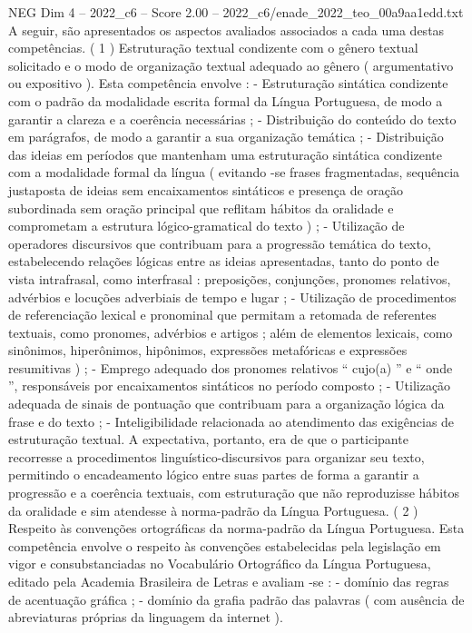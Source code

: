 \begin{textsample}{NEG Dim 4 – 2022\_c6 – Score 2.00 – 2022\_c6/enade\_2022\_teo\_00a9aa1edd.txt}
A seguir, são apresentados os aspectos avaliados associados a cada uma destas competências. ( 1 ) Estruturação textual condizente com o gênero textual solicitado e o modo de organização textual adequado ao gênero ( argumentativo ou expositivo ).
Esta competência envolve : - Estruturação sintática condizente com o padrão da modalidade escrita formal da Língua Portuguesa, de modo a garantir a clareza e a coerência necessárias ; - Distribuição do conteúdo do texto em parágrafos, de modo a garantir a sua organização temática ; - Distribuição das ideias em períodos que mantenham uma estruturação sintática condizente com a modalidade formal da língua ( evitando -se frases fragmentadas, sequência justaposta de ideias sem encaixamentos sintáticos e presença de oração subordinada sem oração principal que reflitam hábitos da oralidade e comprometam a estrutura lógico-gramatical do texto ) ; - Utilização de operadores discursivos que contribuam para a progressão temática do texto, estabelecendo relações lógicas entre as ideias apresentadas, tanto do ponto de vista intrafrasal, como interfrasal : preposições, conjunções, pronomes relativos, advérbios e locuções adverbiais de tempo e lugar ; - Utilização de procedimentos de referenciação lexical e pronominal que permitam a retomada de referentes textuais, como pronomes, advérbios e artigos ; além de elementos lexicais, como sinônimos, hiperônimos, hipônimos, expressões metafóricas e expressões resumitivas ) ; - Emprego adequado dos pronomes relativos “ cujo(a) ” e “ onde ”, responsáveis por encaixamentos sintáticos no período composto ; - Utilização adequada de sinais de pontuação que contribuam para a organização lógica da frase e do texto ; - Inteligibilidade relacionada ao atendimento das exigências de estruturação textual.
A expectativa, portanto, era de que o participante recorresse a procedimentos linguístico-discursivos para organizar seu texto, permitindo o encadeamento lógico entre suas partes de forma a garantir a progressão e a coerência textuais, com estruturação que não reproduzisse hábitos da oralidade e sim atendesse à norma-padrão da Língua Portuguesa. ( 2 ) Respeito às convenções ortográficas da norma-padrão da Língua Portuguesa.
Esta competência envolve o respeito às convenções estabelecidas pela legislação em vigor e consubstanciadas no Vocabulário Ortográfico da Língua Portuguesa, editado pela Academia Brasileira de Letras e avaliam -se : - domínio das regras de acentuação gráfica ; - domínio da grafia padrão das palavras ( com ausência de abreviaturas próprias da linguagem da internet ).

\end{textsample}
